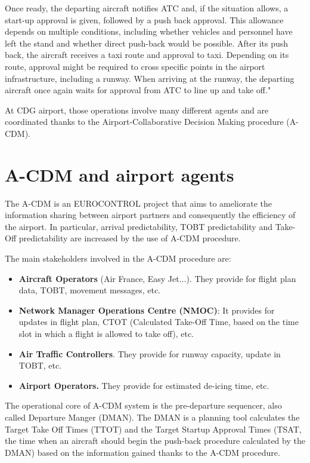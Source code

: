 \documentclass{article}
\begin{document}
Once ready, the departing aircraft notifies ATC and, if the situation allows, a start-up approval is given, followed by a push back approval. This allowance depends on multiple conditions, including whether vehicles and personnel have left the stand and whether direct push-back would be possible.
After its push back, the aircraft receives a taxi route and approval to taxi. Depending on its route, approval might be required to cross specific points in the airport infrastructure, including a runway. When arriving at the runway, the departing aircraft once again waits for approval from ATC to line up and take off."


At CDG airport, those operations involve many different agents and are coordinated thanks to the Airport-Collaborative Decision Making procedure (A-CDM).

\section{A-CDM and airport agents}\label{ACDM}
The A-CDM is an EUROCONTROL project that aims to ameliorate the information sharing between airport partners and consequently the efficiency of the airport. In particular, arrival predictability, TOBT predictability and Take-Off predictability are increased by the use of A-CDM procedure\cite{ACDMimpact}.

The main stakeholders involved in the A-CDM procedure are:
\begin{itemize}
	\item \textbf{Aircraft Operators} (Air France, Easy Jet...). They provide for flight plan data, TOBT, movement messages, etc.
	\item \textbf{Network Manager Operations Centre (NMOC)}: It provides for updates in flight plan, CTOT (Calculated Take-Off Time, based on the time slot in which a flight is allowed to take off), etc.
	\item \textbf{Air Traffic Controllers}. They provide for runway capacity, update in TOBT, etc.
	\item\textbf{Airport Operators.} They provide for estimated de-icing time, etc.
\end{itemize}

The operational core of A-CDM system is the pre-departure sequencer, also called Departure Manger (DMAN). The DMAN is a planning tool calculates the Target Take Off Times (TTOT) and the Target Startup Approval Times (TSAT, the time when an aircraft should begin the push-back procedure calculated by the DMAN) based on the information gained thanks to the A-CDM procedure.
\end{document}

